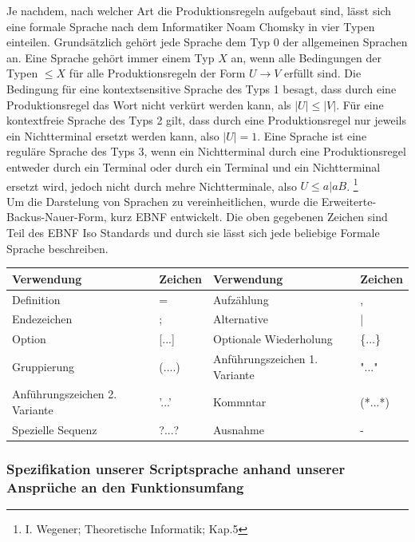 \documentclass[12pt, a4paper]{scrartcl}
\begin{document}
Je nachdem, nach welcher Art die Produktionsregeln aufgebaut sind, lässt sich eine formale Sprache nach dem Informatiker Noam Chomsky in vier Typen einteilen. Grundsätzlich gehört jede Sprache dem Typ 0 der allgemeinen Sprachen an. Eine Sprache gehört immer einem Typ $X$ an, wenn alle Bedingungen  der Typen $\leq X$ für alle Produktionsregeln der Form $U \rightarrow V$ erfüllt sind. Die Bedingung für eine kontextsensitive Sprache des Typs 1 besagt, dass durch eine Produktionsregel das Wort nicht verkürt werden kann, als $|U| \leq |V|$. Für eine kontextfreie Sprache des Typs 2 gilt, dass durch eine Produktionsregel nur jeweils ein Nichtterminal ersetzt werden kann, also $|U| = 1$. Eine Sprache ist eine reguläre Sprache des Typs 3, wenn ein Nichtterminal durch eine Produktionsregel entweder durch ein Terminal oder durch ein Terminal und ein Nichtterminal ersetzt wird, jedoch nicht durch mehre Nichtterminale, also $U \leq a|aB$. \footnote{I. Wegener;	Theoretische Informatik; Kap.5}\\
Um die Darstelung von Sprachen zu vereinheitlichen, wurde die Erweiterte-Backus-Nauer-Form, kurz EBNF entwickelt. Die oben gegebenen Zeichen sind Teil des EBNF Iso Standards und durch sie lässt sich jede beliebige Formale Sprache beschreiben.\\
\begin{table}[]
\begin{tabular}{|ll|ll|}
\hline
Verwendung                    & Zeichen   & Verwendung                    & Zeichen \\ \hline
Definition                    & =         & Aufzählung                    & ,       \\
Endezeichen                   & ;         & Alternative                   & |       \\
Option                        & {[}...{]} & Optionale Wiederholung        & \{...\} \\
Gruppierung                   & (....)    & Anführungszeichen 1. Variante & "..."   \\
Anführungszeichen 2. Variante & '...'     & Kommntar                      & (*...*) \\
Spezielle Sequenz             & ?...?     & Ausnahme                      & -       \\ \hline
\end{tabular}
\end{table}
 
\subsubsection{Spezifikation unserer Scriptsprache anhand unserer Ansprüche an den Funktionsumfang}
\end{document}
